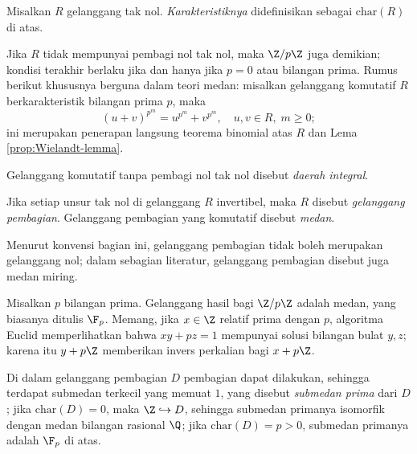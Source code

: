 \begin{definition}\label{def:ring-characteristic}
	Misalkan $R$ gelanggang tak nol. \emph{Karakteristiknya} didefinisikan sebagai $\text{char}(R)$ di atas.
\end{definition}
Jika $R$ tidak mempunyai pembagi nol tak nol, maka $\Z/p\Z$ juga demikian; kondisi terakhir berlaku jika dan hanya jika $p=0$ atau bilangan prima. Rumus berikut khususnya berguna dalam teori medan: misalkan gelanggang komutatif $R$ berkarakteristik bilangan prima $p$, maka
\begin{equation}\label{eqn:freshmen-dream}
	(u+v)^{p^m} = u^{p^m} + v^{p^m}, \quad u, v \in R, \; m \geq 0;
\end{equation}
ini merupakan penerapan langsung teorema binomial atas $R$ dan Lema \ref{prop:Wielandt-lemma}.

\begin{definition}
	Gelanggang komutatif tanpa pembagi nol tak nol disebut \emph{daerah integral}.
\end{definition}

\begin{definition}\label{def:field}
	Jika setiap unsur tak nol di gelanggang $R$ invertibel, maka $R$ disebut \emph{gelanggang pembagian}. Gelanggang pembagian yang komutatif disebut \emph{medan}.
\end{definition}
Menurut konvensi bagian ini, gelanggang pembagian tidak boleh merupakan gelanggang nol; dalam sebagian literatur, gelanggang pembagian disebut juga medan miring.

\begin{example} 
	Misalkan $p$ bilangan prima. Gelanggang hasil bagi $\Z/p\Z$ adalah medan, yang biasanya ditulis $\F_p$. Memang, jika $x \in \Z$ relatif prima dengan $p$, algoritma Euclid memperlihatkan bahwa $xy + pz = 1$ mempunyai solusi bilangan bulat $y,z$; karena itu $y+p\Z$ memberikan invers perkalian bagi $x+p\Z$.
\end{example}
Di dalam gelanggang pembagian $D$ pembagian dapat dilakukan, sehingga terdapat submedan terkecil yang memuat $1$, yang disebut \emph{submedan prima} dari $D$; jika $\text{char}(D)=0$, maka $\Z \hookrightarrow D$, sehingga submedan primanya isomorfik dengan medan bilangan rasional $\Q$; jika $\text{char}(D)=p > 0$, submedan primanya adalah $\F_p$ di atas. 

